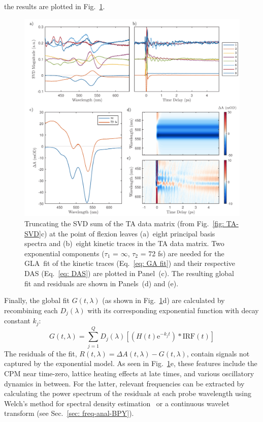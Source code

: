 the results are plotted in Fig.~\ref{fig: TA-GLA}.
%
\begin{figure}[ht!]
  \centering
  \includegraphics[width = \textwidth]{Figures/fig_TA_GLA.pdf}
  \caption[Truncation of a SVD sum at the point of flexion.]{
    Truncating the SVD sum of the TA data matrix (from Fig.~\ref{fig: TA-SVD}c)
    at the point of flexion leaves (a)~eight principal basis spectra and (b)~eight kinetic traces
    in the TA data matrix. Two exponential components ($\tau_1$ = $\infty$, $\tau_2$ = 72 fs)
    are needed for the GLA~fit of the kinetic traces (Eq.~\eqref{eq: GA fit})
    and their respective DAS (Eq.~\eqref{eq: DAS}) are plotted in Panel~(c).
    The resulting global fit and residuals are shown in Panels~(d) and (e).
  }
  \label{fig: TA-GLA}
\end{figure}
%
Finally, the global fit $G(t, \lambda)$ (as shown in Fig.~\ref{fig: TA-GLA}d)
are calculated by recombining each $D_j(\lambda)$ with
its corresponding exponential function with decay constant $k_j$:
%
\begin{equation}
  G(t, \lambda) = \sum_{j = 1}^{Q} D_j(\lambda) \left[  \left( H(t) \text{e}^{-k_j t}\right) \ast \textrm{IRF}(t) \right]
\end{equation}
%
The residuals of the fit, $R(t, \lambda) = \Delta A(t, \lambda) - G(t, \lambda)$, contain
signals not captured by the exponential model. As seen in Fig.~\ref{fig: TA-GLA}e, these features
include the CPM near time-zero, lattice heating effects at late times, and various oscillatory dynamics
in between. For the latter, relevant frequencies can be extracted by calculating
the power spectrum of the residuals at each probe wavelength
using Welch's method for spectral density estimation~\cite{Welch1967}
or a continuous wavelet transform (see Sec.~\ref{sec: freq-anal-BPY}).


